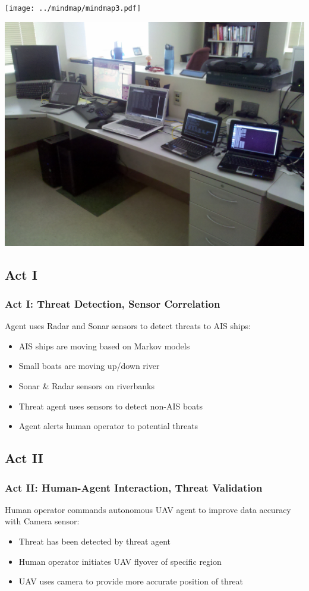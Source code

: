 \documentclass[mathserif,usenames,dvipsnames]{beamer}
\begin{document}
\frame
{
    \begin{center}
        \texttt{[image: ../mindmap/mindmap3.pdf]}
    \end{center}
}
\frame
{
    \begin{center}
        \includegraphics[scale=.1]{images/testbed.jpg}
    \end{center}
}
\subsection{Act I}
\frame
{
    \frametitle{Act I: Threat Detection, Sensor Correlation}
    Agent uses Radar and Sonar sensors to detect threats to AIS ships:\\
    \begin{itemize}
        \item AIS ships are moving based on Markov models
        \item Small boats are moving up/down river
        \item Sonar \& Radar sensors on riverbanks
        \item Threat agent uses sensors to detect non-AIS boats 
        \item Agent alerts human operator to potential threats
    \end{itemize}
}
\subsection{Act II}
\frame
{
    \frametitle{Act II: Human-Agent Interaction, Threat Validation}
    Human operator commands autonomous UAV agent to improve data accuracy with Camera sensor:
    \begin{itemize}
        \item Threat has been detected by threat agent 
        \item Human operator initiates UAV flyover of specific region
        \item UAV uses camera to provide more accurate position of threat
    \end{itemize}
}
\end{document}
